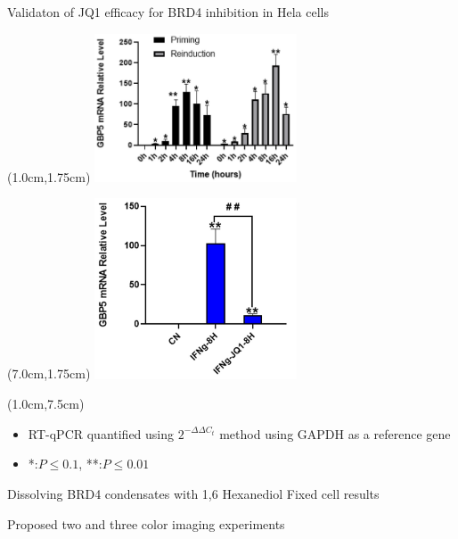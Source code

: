 \documentclass{beamer}					%
\begin{document}
\begin{frame}{Validaton of JQ1 efficacy for BRD4 inhibition in Hela cells}
\begin{textblock*}{6cm}(1.0cm,1.75cm)
\includegraphics[width=6cm]{GBP5-RT-qPCR-crop.png}
\end{textblock*}
\begin{textblock*}{6cm}(7.0cm,1.75cm)
\includegraphics[width=6cm]{GBP5-JQ1-KD-crop.png}
\end{textblock*}

\begin{textblock*}{13cm}(1.0cm,7.5cm)
\begin{itemize}
\item RT-qPCR quantified using $2^{-\Delta\Delta C_{t}}$ method using GAPDH as a reference gene
\item *:$P \leq 0.1$, **:$P \leq 0.01$
\end{itemize}
\end{textblock*}


\end{frame}

\begin{frame}{Dissolving BRD4 condensates with 1,6 Hexanediol}
Fixed cell results
\end{frame}

\begin{frame}{}
Proposed two and three color imaging experiments
\end{frame}
\end{document}
